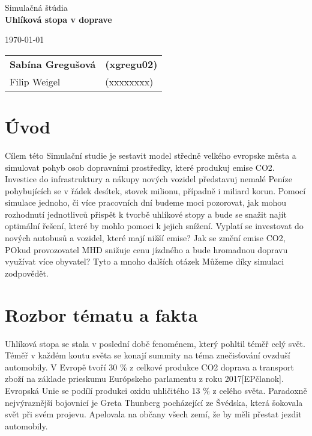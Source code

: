 \documentclass[a4paper, 11pt]{article}
\begin{document}
\begin{titlepage}
\begin{center}


\Huge{Simulačná štúdia} \\
\LARGE{\textbf{Uhlíková stopa v doprave}} \\

\end{center}

\begin{minipage}{0.5 \textwidth}
\Large
\today
\end{minipage}
\hfill
\begin{minipage}[r]{0.5 \textwidth}
\Large
\begin{tabular}{ll}
\textbf{Sabína Gregušová} & \textbf{(xgregu02)} \\
Filip Weigel & (xxxxxxxx)
\end{tabular}
\end{minipage}
\end{titlepage}

\clearpage
\tableofcontents


\clearpage
{}
\setcounter{page}{1}

\section{Úvod}
Cílem této Simulační studie je sestavit model středně velkého evropske města a simulovat pohyb osob dopravními prostředky, které produkuj emise CO2. Investice do infrastruktury a nákupy nových vozidel představuj nemalé Peníze pohybujících se v řádek desítek, stovek milionu, případně i miliard korun. Pomocí simulace jednoho, či více pracovních dní budeme moci pozorovat, jak mohou rozhodnutí jednotlivců přispět k tvorbě uhlíkové stopy a bude se snažit najít optimální řešení, které by mohlo pomoci k jejich snížení. Vyplatí se investovat do nových autobusů a vozidel, které mají nižší emise? Jak se změní emise CO2, POkud provozovatel MHD snižuje cenu jízdného a bude hromadnou dopravu využívat více obyvatel? Tyto a mnoho dalších otázek Můžeme díky simulaci zodpovědět.

\section{Rozbor tématu a fakta}
Uhlíková stopa se stala v poslední době fenoménem, který pohltil téměř celý svět. Téměř v každém koutu světa se konají summity na téma znečisťování ovzduší automobily. V Evropě tvoří 30 \% z celkové produkce CO2 doprava a transport zboží na základe prieskumu Európskeho parlamentu z roku 2017[EPčlanok]. Evropská Unie se podílí produkci oxidu uhličitého 13 \% z celého světa. Paradoxně nejvýraznější bojovnicí je Greta Thunberg pocházející ze Švédska, která šokovala svět při svém projevu. Apelovala na občany všech zemí, že by měli přestat jezdit automobily.
\end{document}
